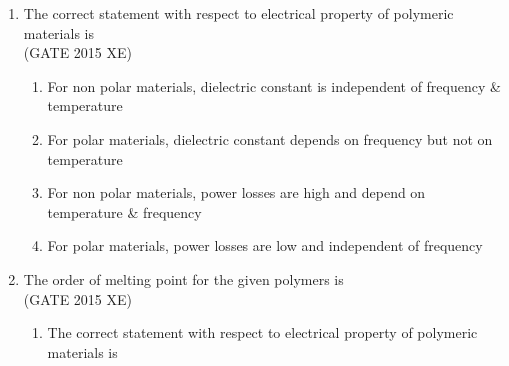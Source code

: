 \documentclass[journal,12pt,onecolumn]{IEEEtran}
\begin{document}
\begin{enumerate}
\begin{enumerate}
\begin{enumerate}
\begin{multicols}{2}
<<<<<<< HEAD
\end{multicols}


\item The correct statement with respect to electrical property of polymeric materials is\\
\hfill{(GATE 2015 XE)} 
\begin{multicols}{2}
\begin{enumerate}
\item For non polar materials, dielectric constant is independent of frequency \& temperature\\
\item For polar materials, dielectric constant depends on frequency but not on temperature\\
\item For non polar materials, power losses are high and depend on temperature \& frequency\\
\item For polar materials, power losses are low and independent of frequency
\end{enumerate}
\end{multicols}


\item The order of melting point for the given polymers is\\
\hfill{(GATE 2015 XE)} 
\begin{multicols}{2}
\begin{enumerate}
=======

\vspace{0.5cm}

\item The correct statement with respect to electrical property of polymeric materials is
\hfill{} \\


\end{enumerate}
\end{multicols}
\end{enumerate}
\end{enumerate}
\end{enumerate}
\end{document}
